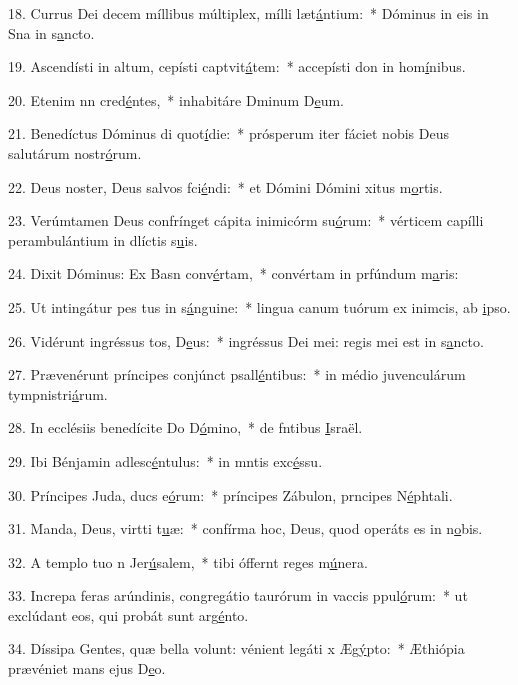 18. Currus Dei decem míllibus múltiplex, mílli læt\uline{á}ntium:~* Dóminus in eis in Sna in s\uline{a}ncto.\par 
19. Ascendísti in altum, cepísti captvit\uline{á}tem:~* accepísti don in hom\uline{í}nibus.\par 
20. Etenim nn cred\uline{é}ntes,~* inhabitáre Dminum D\uline{e}um.\par 
21. Benedíctus Dóminus di quot\uline{í}die:~* prósperum iter fáciet nobis Deus salutárum nostr\uline{ó}rum.\par 
22. Deus noster, Deus salvos fci\uline{é}ndi:~* et Dómini Dómini xitus m\uline{o}rtis.\par 
23. Verúmtamen Deus confrínget cápita inimicórm su\uline{ó}rum:~* vérticem capílli perambulántium in dlíctis s\uline{u}is.\par 
24. Dixit Dóminus: Ex Basn conv\uline{é}rtam,~* convértam in prfúndum m\uline{a}ris:\par 
25. Ut intingátur pes tus in s\uline{á}nguine:~* lingua canum tuórum ex inimcis, ab \uline{i}pso.\par 
26. Vidérunt ingréssus tos, D\uline{e}us:~* ingréssus Dei mei: regis mei  est in s\uline{a}ncto.\par 
27. Prævenérunt príncipes conjúnct psall\uline{é}ntibus:~* in médio juvenculárum tympnistri\uline{á}rum.\par 
28. In ecclésiis benedícite Do D\uline{ó}mino,~* de fntibus \uline{I}sraël.\par 
29. Ibi Bénjamin adlesc\uline{é}ntulus:~* in mntis exc\uline{é}ssu.\par 
30. Príncipes Juda, ducs e\uline{ó}rum:~* príncipes Zábulon, prncipes N\uline{é}phtali.\par 
31. Manda, Deus, virtti t\uline{u}æ:~* confírma hoc, Deus, quod operáts es in n\uline{o}bis.\par 
32. A templo tuo n Jer\uline{ú}salem,~* tibi óffernt reges m\uline{ú}nera.\par 
33. Increpa feras arúndinis, congregátio taurórum in vaccis ppul\uline{ó}rum:~* ut exclúdant eos, qui probát sunt arg\uline{é}nto.\par 
34. Díssipa Gentes, quæ bella volunt: vénient legáti x Æg\uline{ý}pto:~* Æthiópia prævéniet mans ejus D\uline{e}o.\par 
